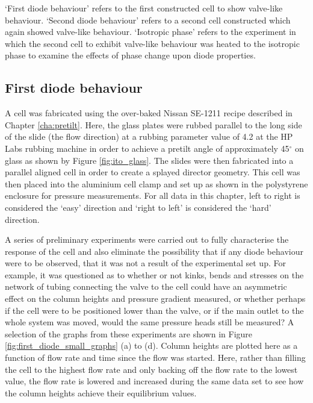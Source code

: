 `First diode behaviour' refers to the first constructed cell to show valve-like behaviour. `Second diode behaviour' refers to a second cell constructed which again showed valve-like behaviour. `Isotropic phase' refers to the experiment in which the second cell to exhibit valve-like behaviour was heated to the isotropic phase to examine the effects of phase change upon diode properties.


\subsection{First diode behaviour}
\label{sec:first_diode}
A cell was fabricated using the over-baked Nissan SE-1211 recipe described in Chapter \ref{cha:pretilt}. Here, the glass plates were rubbed parallel to the long side of the slide (the flow direction) at a rubbing parameter value of 4.2 at the HP Labs rubbing machine in order to achieve a pretilt angle of approximately 45$^{\circ}$ on glass as shown by Figure \ref{fig:ito_glass}. The slides were then fabricated into a parallel aligned cell in order to create a splayed director geometry. This cell was then placed into the aluminium cell clamp and set up as shown in the polystyrene enclosure for pressure measurements. For all data in this chapter, left to right is considered the `easy' direction and `right to left' is considered the `hard' direction.

A series of preliminary experiments were carried out to fully characterise the response of the cell and also eliminate the possibility that if any diode behaviour were to be observed, that it was not a result of the experimental set up. For example, it was questioned as to whether or not kinks, bends and stresses on the network of tubing connecting the valve to the cell could have an asymmetric effect on the column heights and pressure gradient measured, or whether perhaps if the cell were to be positioned lower than the valve, or if the main outlet to the whole system was moved, would the same pressure heads still be measured? A selection of the graphs from these experiments are shown in Figure \ref{fig:first_diode_small_graphs} (a) to (d). Column heights are plotted here as a function of flow rate and time since the flow was started. Here, rather than filling the cell to the highest flow rate and only backing off the flow rate to the lowest value, the flow rate is lowered and increased during the same data set to see how the column heights achieve their equilibrium values.

